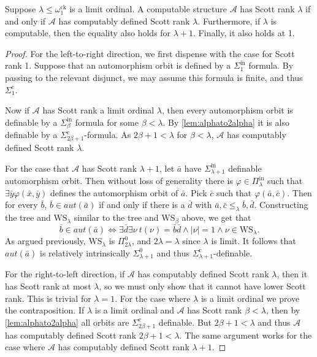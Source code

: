 \documentclass[10pt,a4paper]{amsart}
\newcommand\+[1]{\mathcal{#1}}
\renewcommand\*[1]{\mathbf{#1}}
\renewcommand\=[1]{\text{#1}}
\renewcommand\*[1]{\mathbf{#1}}
\renewcommand{\phi}{\varphi}
\newcommand{\Pinf}[1]{\Pi^{\mathrm{in}}_{#1}}
\newcommand{\Sinf}[1]{\Sigma^{\mathrm{in}}_{#1}}
\newcommand{\Sicom}[1]{\Sigma^{\mathrm{c}}_{#1}}
\newcommand{\ock}{\omega_{1}^{\mathrm{ck}}}
\begin{document}
\begin{theorem}\label{thm:limitiffcompdefined}
  Suppose $\lambda\leq \ock$ is a limit ordinal. A computable structure $\+A$ has Scott rank $\lambda$ if and only if $\+A$ has computably defined Scott rank $\lambda$. Furthermore, if $\lambda$ is computable, then the equality also holds for $\lambda+1$.  Finally, it also holds at 1.
\end{theorem}
\begin{proof}
For the left-to-right direction, we first dispense with the case for Scott rank 1.  Suppose that an automorphism orbit is defined by a $\Sinf{1}$ formula.  By passing to the relevant disjunct, we may assume this formula is finite, and thus $\Sicom{1}$.

Now if $\+A$ has Scott rank a limit ordinal $\lambda$, then every automorphism orbit is definable by a $\Sinf{\beta}$ formula for some $\beta<\lambda$. By \cref{lem:alphato2alpha} it is also definable by a $\Sicom{2\beta+1}$-formula. As $2\beta+1<\lambda$ for $\beta<\lambda$, $\+A$ has computably defined Scott rank $\lambda$.

For the case that $\+A$ has Scott rank $\lambda+1$, let $\bar a$ have $\Sinf{\lambda+1}$ definable automorphism orbit. Then without loss of generality there is $\phi\in \Pinf{\lambda}$ such that $\exists \bar y \phi(\bar x,\bar y)$ defines the automorphism orbit of $\bar a$. Pick $\bar c$ such that $\phi(\bar a,\bar c)$. Then for every $\bar b$, $\bar b\in aut(\bar a)$ if and only if there is a $\bar d$ with $\bar a,\bar c\leq_{\lambda}\bar b,\bar d$. Constructing the tree and $\mathrm{WS}_\lambda$ similar to the tree and $\mathrm{WS}_\beta$ above, we get that 
  \[ \bar b\in aut(\bar a) \iff \exists \bar d\exists \nu \ t(\nu)=\bar b\bar d \land |\nu|=1 \land \nu \in \mathrm{WS}_{\lambda}.\] 
  As argued previously, $\mathrm{WS}_\lambda$ is $\Pi^0_{2\lambda}$, and $2\lambda = \lambda$ since $\lambda$ is limit. It follows that $aut(\bar a)$ is relatively intrinsically $\Sigma^0_{\lambda+1}$ and thus $\Sicom{\lambda+1}$-definable.

  For the right-to-left direction, if $\+A$ has computably defined Scott rank $\lambda$, then it has Scott rank at most $\lambda$, so we must only show that it cannot have lower Scott rank. This is trivial for $\lambda=1$.
  For the case where $\lambda$ is a limit ordinal we prove the contraposition. If $\lambda$ is a limit ordinal and $\+A$ has Scott rank $\beta<\lambda$, then by \cref{lem:alphato2alpha} all orbits are $\Sicom{2\beta+1}$ definable. But $2\beta+1<\lambda$ and thus $\+A$ has computably defined Scott rank $2\beta+1<\lambda$. The same argument works for the case where $\+A$ has computably defined Scott rank $\lambda+1$.
\end{proof}
\end{document}
